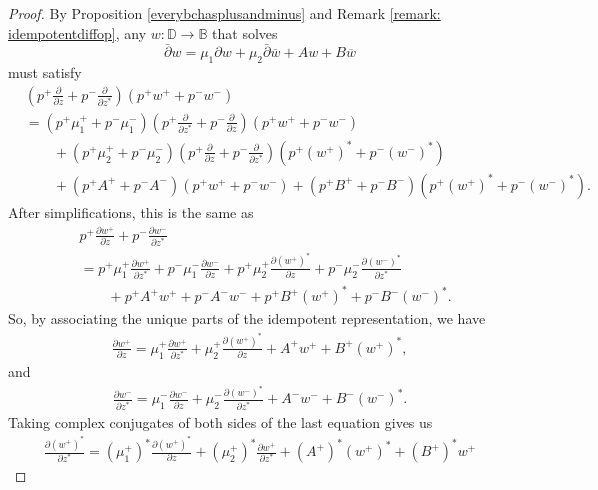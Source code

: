 \documentclass[12pt,reqno]{amsart}
\theoremstyle{definition}
\theoremstyle{remark}
\newcommand{\p}{\partial}
\newcommand{\dbar}{\bar\partial}
\newcommand{\bc}{\mathbb{B}}
\newcommand{\disk}{\mathbb{D}}
\begin{document}
\begin{proof}

By Proposition \ref{everybchasplusandminus} and Remark \ref{remark: idempotentdiffop}, any $w:\disk\to\bc$ that solves 
\[
        \dbar w = \mu_1  \p w + \mu_2 \dbar \overline{w} + Aw + B\overline{w}
    \]
 must satisfy
\begin{align*}
    &\left(p^+ \frac{\p}{\p z} + p^- \frac{\p}{\p z^*}\right)(p^+ w^+ + p^- w^-) \\
    &= (p^+\mu_1^+ + p^- \mu_1^-)  \left(p^+ \frac{\p}{\p z^*} + p^- \frac{\p}{\p z}\right)(p^+ w^+ + p^- w^-) \\
    &\quad\quad + (p^+\mu_2^+ + p^- \mu_2^-)  \left(p^+ \frac{\p}{\p z} + p^- \frac{\p}{\p z^*}\right)(p^+ (w^+)^* + p^- (w^-)^*) \\
    &\quad\quad + (p^+A^+ + p^- A^-)(p^+w^+ + p^- w^-) + (p^+B^+ + p^- B^-)(p^+(w^+)^* + p^- (w^-)^*).
\end{align*}
After simplifications, this is the same as
\begin{align*}
    &p^+\frac{\p w^+}{\p z} + p^- \frac{\p w^-}{\p z^*} \\
    &= p^+ \mu_1^+\frac{\p w^+}{\p z^*} + p^-\mu_1^- \frac{\p w^-}{\p z} + p^+\mu_2^+\frac{\p (w^+)^*}{\p z} + p^-\mu_2^- \frac{\p (w^-)^*}{\p z^*} \\
    & \quad \quad + p^+ A^+ w^+ + p^- A^- w^- + p^+ B^+ (w^+)^* + p^- B^- (w^-)^*.
\end{align*}
So, by associating the unique parts of the idempotent representation, we have
\begin{align*}
    \frac{\p w^+}{\p z} = \mu_1^+\frac{\p w^+}{\p z^*} + \mu_2^+ \frac{\p (w^+)^*}{\p z} + A^+ w^+ + B^+ (w^+)^*,
\end{align*}
and
\begin{align*}
    \frac{\p w^-}{\p z^*} = \mu_1^- \frac{\p w^-}{\p z} + \mu_2^- \frac{\p (w^-)^*}{\p z^*}  + A^- w^- + B^- (w^-)^*.
\end{align*}
Taking complex conjugates of both sides of the last equation gives us
\begin{align*}
     \frac{\p (w^+)^*}{\p z^*} = (\mu_1^+)^*\frac{\p (w^+)^*}{\p z} + (\mu_2^+)^* \frac{\p w^+}{\p z^*} + (A^+)^* (w^+)^* +  (B^+)^* w^+
\end{align*}


\end{proof}
\end{document}
